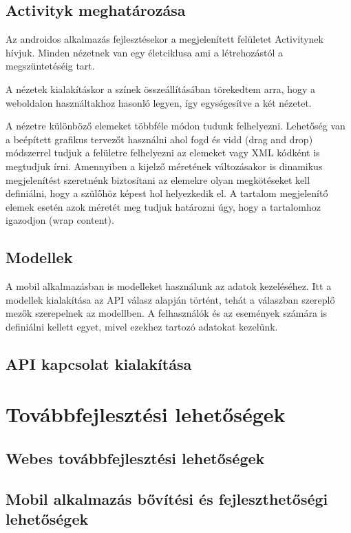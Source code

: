 \documentclass[
]{thesis-ekf}
\theoremstyle{definition}
\theoremstyle{remark}
\begin{document}
\section{Activityk meghatározása}
Az androidos alkalmazás fejlesztésekor a megjelenített felületet Activitynek hívjuk. Minden nézetnek van egy életciklusa ami a létrehozástól a megszüntetéséig tart.

A nézetek kialakításkor a színek összeállításában törekedtem arra, hogy a weboldalon használtakhoz hasonló legyen, így egységesítve a két nézetet. 

A nézetre különböző elemeket többféle módon tudunk felhelyezni. Lehetőség van a beépített grafikus tervezőt használni ahol fogd és vidd (drag and drop) módszerrel tudjuk a felületre felhelyezni az elemeket vagy XML kódként is megtudjuk írni. Amennyiben a kijelző méretének változásakor is dinamikus megjelenítést szeretnénk biztosítani az elemekre olyan megkötéseket kell definiálni, hogy a szülőhöz képest hol helyezkedik el. A tartalom megjelenítő elemek esetén azok méretét meg tudjuk határozni úgy, hogy a tartalomhoz igazodjon (wrap content).

\section{Modellek}
A mobil alkalmazásban is modelleket használunk az adatok kezeléséhez. Itt a modellek kialakítása az API válasz alapján történt, tehát a válaszban szereplő mezők szerepelnek az modellben. A felhasználók és az események számára is definiálni kellett egyet, mivel ezekhez tartozó adatokat kezelünk. 

\section{API kapcsolat kialakítása}

\chapter{Továbbfejlesztési lehetőségek}
\section{Webes továbbfejlesztési lehetőségek}

\section{Mobil alkalmazás bővítési és fejleszthetőségi lehetőségek}
\end{document}
